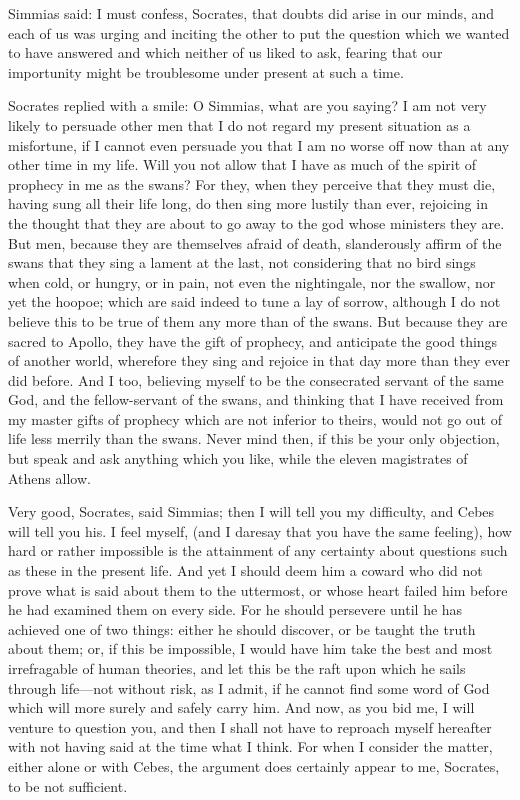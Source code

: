 Simmias said: I must confess, Socrates, that doubts did arise in our
minds, and each of us was urging and inciting the other to put the
question which we wanted to have answered and which neither of us liked to
ask, fearing that our importunity might be troublesome under present at
such a time.

Socrates replied with a smile: O Simmias, what are you saying? I am not
very likely to persuade other men that I do not regard my present
situation as a misfortune, if I cannot even persuade you that I am no
worse off now than at any other time in my life. Will you not allow that I
have as much of the spirit of prophecy in me as the swans? For they, when
they perceive that they must die, having sung all their life long, do then
sing more lustily than ever, rejoicing in the thought that they are about
to go away to the god whose ministers they are. But men, because they are
themselves afraid of death, slanderously affirm of the swans that they
sing a lament at the last, not considering that no bird sings when cold,
or hungry, or in pain, not even the nightingale, nor the swallow, nor yet
the hoopoe; which are said indeed to tune a lay of sorrow, although I do
not believe this to be true of them any more than of the swans. But
because they are sacred to Apollo, they have the gift of prophecy, and
anticipate the good things of another world, wherefore they sing and
rejoice in that day more than they ever did before. And I too, believing
myself to be the consecrated servant of the same God, and the
fellow-servant of the swans, and thinking that I have received from my
master gifts of prophecy which are not inferior to theirs, would not go
out of life less merrily than the swans. Never mind then, if this be your
only objection, but speak and ask anything which you like, while the
eleven magistrates of Athens allow.

Very good, Socrates, said Simmias; then I will tell you my difficulty, and
Cebes will tell you his. I feel myself, (and I daresay that you have the
same feeling), how hard or rather impossible is the attainment of any
certainty about questions such as these in the present life. And yet I
should deem him a coward who did not prove what is said about them to the
uttermost, or whose heart failed him before he had examined them on every
side. For he should persevere until he has achieved one of two things:
either he should discover, or be taught the truth about them; or, if this
be impossible, I would have him take the best and most irrefragable of
human theories, and let this be the raft upon which he sails through life—not
without risk, as I admit, if he cannot find some word of God which will
more surely and safely carry him. And now, as you bid me, I will venture
to question you, and then I shall not have to reproach myself hereafter
with not having said at the time what I think. For when I consider the
matter, either alone or with Cebes, the argument does certainly appear to
me, Socrates, to be not sufficient.

